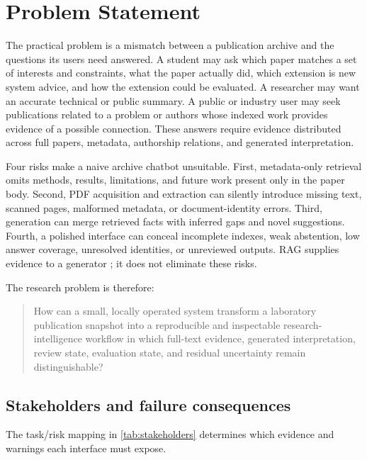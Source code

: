\chapter{Problem Statement}
\label{ch:problem}

The practical problem is a mismatch between a publication archive and the questions its users need answered. A student may ask which paper matches a set of interests and constraints, what the paper actually did, which extension is new system advice, and how the extension could be evaluated. A researcher may want an accurate technical or public summary. A public or industry user may seek publications related to a problem or authors whose indexed work provides evidence of a possible connection. These answers require evidence distributed across full papers, metadata, authorship relations, and generated interpretation.

Four risks make a naive archive chatbot unsuitable. First, metadata-only retrieval omits methods, results, limitations, and future work present only in the paper body. Second, PDF acquisition and extraction can silently introduce missing text, scanned pages, malformed metadata, or document-identity errors. Third, generation can merge retrieved facts with inferred gaps and novel suggestions. Fourth, a polished interface can conceal incomplete indexes, weak abstention, low answer coverage, unresolved identities, or unreviewed outputs. RAG supplies evidence to a generator \cite{lewis2020rag}; it does not eliminate these risks.

The research problem is therefore:

\begin{quote}
How can a small, locally operated system transform a laboratory publication snapshot into a reproducible and inspectable research-intelligence workflow in which full-text evidence, generated interpretation, review state, evaluation state, and residual uncertainty remain distinguishable?
\end{quote}

\section{Stakeholders and failure consequences}

The task/risk mapping in \cref{tab:stakeholders} determines which evidence and warnings each interface must expose.

